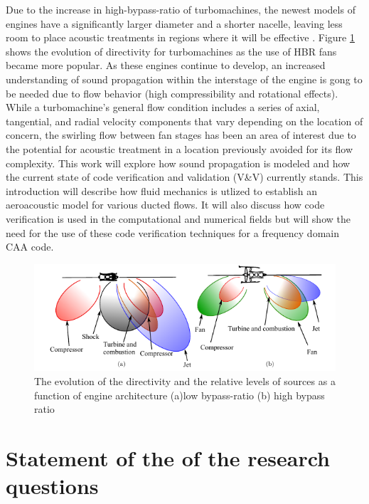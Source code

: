 Due to the increase in high-bypass-ratio of turbomachines, the newest models of 
engines have a significantly larger diameter and a shorter nacelle, leaving less
room to place acoustic treatments in regions where it will be effective \cite{Kozaczuk2017}.
Figure \ref{fig:intro} shows the evolution of directivity for turbomachines as 
the use of HBR fans became more popular. As these engines continue 
to develop, an increased understanding of sound propagation within
the interstage of the engine is gong to be needed due to flow behavior (high compressibility
and rotational effects).  While a turbomachine's general flow condition includes 
a series of axial, tangential, and radial velocity components that vary
depending on the location of concern, the swirling flow between fan stages has 
been an area of interest due to the potential for acoustic treatment in a 
location previously avoided for its flow complexity. This work will explore how 
sound propagation is modeled and how the current state of code verification and 
validation (V\&V) currently stands. This introduction will describe how fluid mechanics
is utlized to establish an aeroacoustic model for various ducted flows. It will 
also discuss how code verification is used in the computational and numerical fields
but will show the need for the use of these code verification techniques for 
a frequency domain CAA code. 




\begin{figure}
    \centering
    \includegraphics[width=\textwidth]{Chapter-1-Introduction/Figures/lowVhighBPRdirectivitySMITH2004.png}
    \caption{ The evolution of the directivity and the 
    relative levels of sources as a function of engine architecture (a)low bypass-ratio (b) high bypass ratio \cite{smith1989aircraft}}
    \label{fig:intro}
\end{figure}

\section{Statement of the of the research questions}
